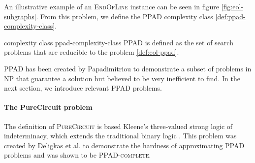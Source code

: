 \vspace{0.2cm}

An illustrative example of an \textsc{EndOfLine} instance can be seen in figure \ref{fig:eol-subgraphs}.
From this problem, we define the \textsc{PPAD} complexity class \ref{def:ppad-complexity-class}.

\begin{definitionbox}{ complexity class \cite{papadimitriou_ComplexityParityArgument_1994}}{ppad-complexity-class}
    \textsc{PPAD} is defined as the set of search problems that
    are reducible to the  problem \ref{def:eol-ppad}.
\end{definitionbox}

\textsc{PPAD} has been created by Papadimitriou \cite{papadimitriou_ComplexityParityArgument_1994}
to demonstrate a subset of problems in \textsc{NP} that guarantee
a solution but believed to be very inefficient to find.
In the next section,
we introduce relevant \textsc{PPAD} problems.

\paragraph{The PureCircuit problem}
\label{par:pure-circ-def}

The definition of \textsc{PureCircuit} is based Kleene's three-valued strong logic of indeterminacy,
which extends the traditional binary logic \cite{kleene_IntroductionMetamathematics_2009}.
This problem was created by Deligkas et al. \cite{deligkas_PureCircuitTightInapproximability_2024}
to demonstrate the hardness of approximating \textsc{PPAD} problems and was shown to be \textsc{PPAD-complete}.


